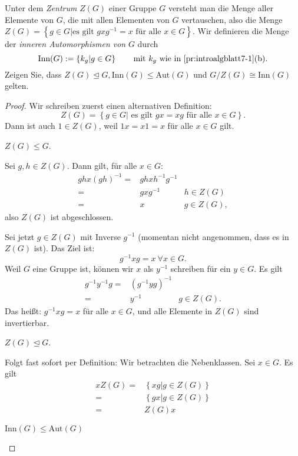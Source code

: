\begin{Problem}
	Unter dem \emph{Zentrum} $Z(G)$ einer Gruppe $G$ versteht man die Menge aller Elemente von $G$, die mit allen Elementen von $G$ vertauschen, also die Menge $Z(G)=\left\{ g\in G|\text{es gilt }gxg^{-1}=x\text{ f\"{u}r alle }x\in G \right\} $. Wir definieren die Menge der \emph{inneren Automorphismen von} $G$ durch
\[
	\text{Inn}(G):=\left\{ k_g|g\in G \right\} \qquad\text{mit }k_g\text{ wie in \ref{pr:introalgblatt7-1}(b)}
.\] 
Zeigen Sie, dass $Z(G)\trianglelefteq G,\text{Inn}(G)\le \text{Aut}(G)$ und $G / Z(G)\cong \text{Inn}(G)$ gelten.
\end{Problem}
\begin{proof}
	Wir schreiben zuerst einen alternativen Definition:
	\[
		Z(G)=\left\{ g\in G|\text{ es gilt }gx=xg\text{ f\"{u}r alle }x\in G \right\} 
	.\] 
	Dann ist auch $1\in Z(G)$, weil $1x=x 1=x$ f\"{u}r alle $x\in G$ gilt.
	\begin{parts}
	\item $Z(G)\le G$.

		Sei $g,h\in Z(G)$. Dann gilt, f\"{u}r alle $x\in G$:
		\begin{align*}
			ghx(gh)^{-1}=&ghxh^{-1}g^{-1}\\
			=&gxg^{-1} & h\in Z(G)\\
			=&x & g\in Z(G),
		\end{align*}
		also $Z(G)$ ist abgeschlossen.

		Sei jetzt $g\in Z(G)$ mit Inverse $g^{-1}$ (momentan nicht angenommen, dass es in $Z(G)$ ist). Das Ziel ist:
		\[
			g^{-1}xg=x~\forall x\in G
		.\] 
		Weil $G$ eine Gruppe ist, können wir $x$ als $y^{-1}$ schreiben f\"{u}r ein $y\in G$. Es gilt
		\begin{align*}
			g^{-1}y^{-1}g=&(g^{-1}yg)^{-1}\\
			=&y^{-1} & g\in Z(G).
		\end{align*}
		Das heißt: $g^{-1}xg=x$ f\"{u}r alle $x\in G$, und alle Elemente in $Z(G)$ sind invertierbar.
	\item $Z(G)\trianglelefteq G$.

		Folgt fast sofort per Definition: Wir betrachten die Nebenklassen. Sei $x\in G$. Es gilt
		\begin{align*}
			xZ(G)=&\left\{ xg|g\in Z(G) \right\}\\
		=&\left\{ gx|g\in Z(G) \right\} \\
		=& Z(G)x
		\end{align*}
	\item $\text{Inn}(G)\le \text{Aut}(G)$


\end{parts}
\end{proof}
